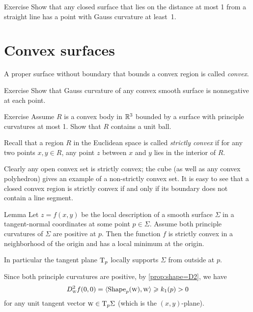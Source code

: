 \begin{thm}{Exercise}\label{ex:positive-gauss}
Show that any closed surface that lies on the distance at most 1 from a straight line has a point with Gauss curvature at least~1.
\end{thm}

\section{Convex surfaces}

A proper surface without boundary that bounds a convex region is called \emph{convex}.

\begin{thm}{Exercise}\label{ex:convex-surf}
Show that Gauss curvature of any convex smooth surface is nonnegative at each point.
\end{thm}

\begin{thm}{Exercise}\label{ex:convex-lagunov}
Assume $R$ is a convex body in $\mathbb{R}^3$ bounded by a surface with principle curvatures at most 1.
Show that $R$ contains a unit ball.
\end{thm}

Recall that a region $R$ in the Euclidean space is called  \emph{strictly convex} if for any two points $x,y\in R$, any point $z$ between $x$ and $y$ lies in the interior of $R$.

Clearly any open convex set is strictly convex;
the cube (as well as any convex polyhedron) gives an example of a non-strictly convex set.
It is easy to see that a closed convex region is strictly convex if and only if its boundary does not contain a line segment. %

\begin{thm}{Lemma}\label{lem:gauss+=>convexity}
Let $z=f(x,y)$ be the local description of a smooth surface $\Sigma$ in a tangent-normal coordinates at some point $p\in\Sigma$.
Assume both principle curvatures of $\Sigma$ are positive at $p$.
Then the function $f$ is strictly convex in a neighborhood of the origin and has a local minimum at the origin. %

In particular the tangent plane $\mathrm{T}_p$ locally supports $\Sigma$ from outside at $p$.
\end{thm}

Since both principle curvatures are positive, by \ref{prop:shape=D2}, we have 
\[D^2_{\textsc w}f(0,0)=\langle \mathop{\rm Shape}\nolimits_p({\textsc w}),{\textsc w}\rangle\geqslant k_1(p)>0\] 
for any unit tangent vector ${\textsc w}\in\mathrm{T}_p\Sigma$ (which is the $(x,y)$-plane).

